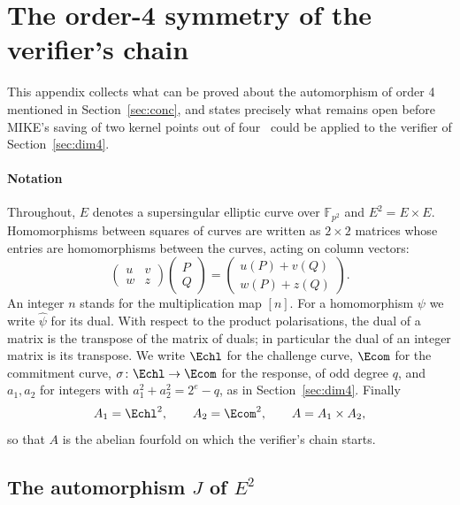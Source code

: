 \section{The order-4 symmetry of the verifier's chain}
\label{app:symmetry}

This appendix collects what can be proved about the automorphism of order
4 mentioned in Section~\ref{sec:conc}, and states precisely what remains
open before MIKE's saving of two kernel points out of four~\cite[Appendix
E.2]{BDD+26} could be applied to the verifier of Section~\ref{sec:dim4}.

\paragraph{Notation}
Throughout, $E$ denotes a supersingular elliptic curve over
$\mathbb{F}_{p^2}$ and $E^2 = E \times E$. Homomorphisms between squares of
curves are written as $2 \times 2$ matrices whose entries are homomorphisms
between the curves, acting on column vectors:
\[
\begin{pmatrix} u & v \\ w & z \end{pmatrix}
\begin{pmatrix} P \\ Q \end{pmatrix}
=
\begin{pmatrix} u(P) + v(Q) \\ w(P) + z(Q) \end{pmatrix}.
\]
An integer $n$ stands for the multiplication map $[n]$. For a homomorphism
$\psi$ we write $\widehat{\psi}$ for its dual. With respect to the product
polarisations, the dual of a matrix is the transpose of the matrix of
duals; in particular the dual of an integer matrix is its transpose. We
write $\Echl$ for the challenge curve, $\Ecom$ for the commitment curve,
$\sigma \colon \Echl \to \Ecom$ for the response, of odd degree $q$, and
$a_1, a_2$ for integers with $a_1^2 + a_2^2 = 2^e - q$, as in
Section~\ref{sec:dim4}. Finally
\[
A_1 = \Echl^2, \qquad A_2 = \Ecom^2, \qquad A = A_1 \times A_2,
\]
so that $A$ is the abelian fourfold on which the verifier's chain starts.

\subsection{The automorphism \texorpdfstring{$J$}{J} of \texorpdfstring{$E^2$}{E\^{}2}}

